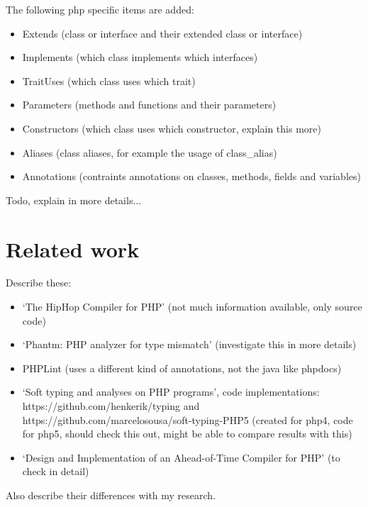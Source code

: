 \documentclass[../main.tex]{subfiles}
\begin{document}
    The following php specific items are added:
    \begin{itemize}
        \item Extends (class or interface and their extended class or interface)
        \item Implements (which class implements which interfaces)
        \item TraitUses (which class uses which trait)
        \item Parameters (methods and functions and their parameters)
        \item Constructors (which class uses which constructor, explain this more)
        \item Aliases (class aliases, for example the usage of class\_{}alias)
        \item Annotations (contraints annotations on classes, methods, fields and variables)
    \end{itemize}
    Todo, explain in more details...

    
    \section{Related work}
    Describe these:
    \begin{itemize}
        \item `The HipHop Compiler for PHP'\cite{Zhao:12} (not much information available, only source code)
        \item `Phantm: PHP analyzer for type mismatch'\cite{Kne:10,Bar:10} (investigate this in more details)
        \item PHPLint \footnotemark (uses a different kind of annotations, not the java like phpdocs)
        \item `Soft typing and analyses on PHP programs'\cite{}, code implementations: https://github.com/henkerik/typing and https://github.com/marcelosousa/soft-typing-PHP5 (created for php4, code for php5, should check this out, might be able to compare results with this)
        \item `Design and Implementation of an Ahead-of-Time Compiler for PHP'\cite{Big:10} (to check in detail)
    \end{itemize}
    Also describe their differences with my research.
    
\end{document}
